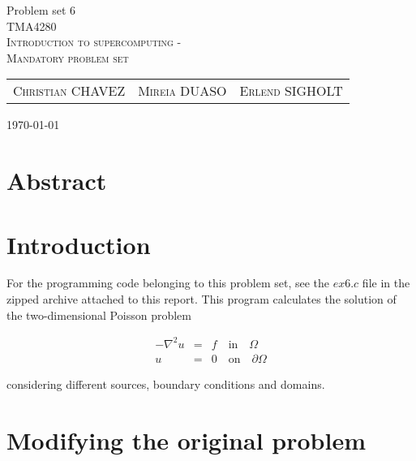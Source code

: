 \documentclass[fontsize=11pt,paper=a4,titlepage]{report}
\begin{document}
\begin{center}


{\huge Problem set 6}\\[0.5cm]

\textsc{\LARGE TMA4280}\\[0.5cm]
\textsc{\large Introduction to supercomputing -}\\
\textsc{\large Mandatory problem set}\\[0.6cm]

\begin{table}[h]
\centering
\begin{tabular}{ccc}
	\textsc{Christian CHAVEZ} & \textsc{Mireia DUASO} & \textsc{Erlend SIGHOLT}
\end{tabular}
\end{table}

\large{\today}
\vfill
\section*{Abstract}
\end{center}


\addtocounter{chapter}{1}

\clearpage
\section{Introduction}

For the programming code belonging to this problem set, see the $\textit{ex6.c}$
file in the zipped archive attached to this report. This program calculates the
solution of the two-dimensional Poisson problem

\begin{eqnarray}
	-\nabla^2 u & = & f \quad \textrm{in} \quad \Omega \\
	u & = & 0 \quad \textrm{on} \quad \partial\Omega
	\label{eq:Poisson}
\end{eqnarray}

considering different sources, boundary conditions and domains.



\section{Modifying the original problem}
\end{document}
